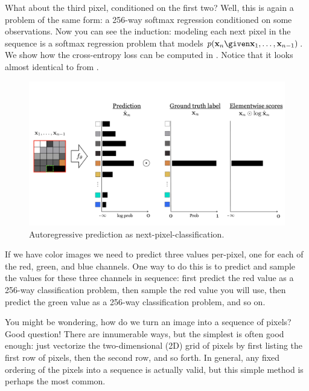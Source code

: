 What about the third pixel, conditioned on the first two? Well, this is again a problem of the same form: a 256-way softmax regression conditioned on some observations. Now you can see the induction: modeling each next pixel in the sequence is a softmax regression problem that models $p(\mathbf{x}_n \given \mathbf{x}_1, \ldots, \mathbf{x}_{n-1})$. We show how the cross-entropy loss can be computed in \fig{\ref{fig:generative_models:autoregressive_softmax_regression}}. Notice that it looks almost identical to \fig{\ref{fig:softmax_regression_diagram}} from \chap{\ref{chapter:intro_to_learning}}.
\begin{figure}[t]
    \centerline{
    \includegraphics[width=1.0\linewidth]{./figures/generative_models/autoregressive_softmax_regression.pdf}
    }
    \caption{Autoregressive prediction as next-pixel-classification.}
    \label{fig:generative_models:autoregressive_softmax_regression}
\end{figure}
If we have color images we need to predict three values per-pixel, one for each of the red, green, and blue channels. One way to do this is to predict and sample the values for these three channels in sequence: first predict the red value as a 256-way classification problem, then sample the red value you will use, then predict the green value as a 256-way classification problem, and so on.

You might be wondering, how do we turn an image into a sequence of pixels? Good question! There are innumerable ways, but the simplest is often good enough: just vectorize the two-dimensional (2D) grid of pixels by first listing the first row of pixels, then the second row, and so forth. In general, any fixed ordering of the pixels into a sequence is actually valid, but this simple method is perhaps the most common.

